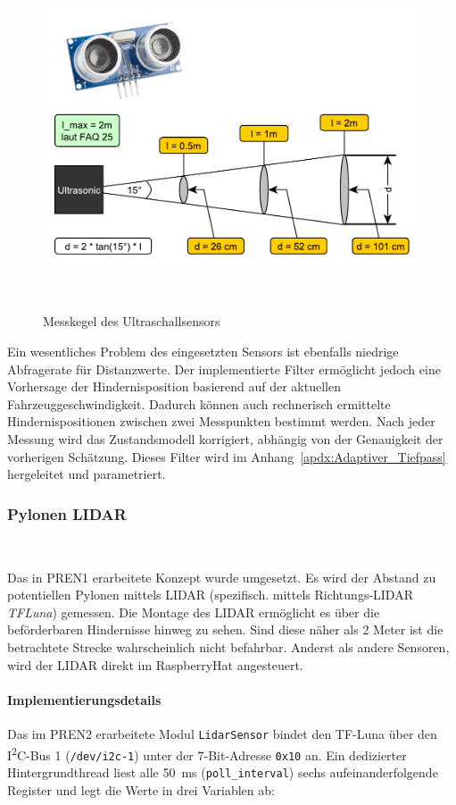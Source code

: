 \documentclass[main.tex]{subfiles} %
\begin{document}
\begin{figure}[H]
  \centering
  \includegraphics[width =
    0.5\linewidth]{./fig_Antriebsregelung_Firmware/Auslesegenauigkeit_Ultraschall.pdf}
  \caption{Messkegel des Ultraschallsensors}~\label{fig:HcSr04_Messkegel}
\end{figure}

Ein wesentliches Problem des eingesetzten Sensors ist ebenfalls niedrige
Abfragerate für Distanzwerte. Der implementierte Filter ermöglicht jedoch eine
Vorhersage der Hindernisposition basierend auf der aktuellen
Fahrzeuggeschwindigkeit. Dadurch können auch rechnerisch ermittelte
Hindernispositionen zwischen zwei Messpunkten bestimmt werden. Nach jeder
Messung wird das Zustandsmodell korrigiert, abhängig von der Genauigkeit der
vorherigen Schätzung. Dieses Filter wird im
Anhang~\ref{apdx:Adaptiver_Tiefpass} hergeleitet und parametriert.


\subsubsection*{Pylonen LIDAR}~\label{sec:Sensorik_Lidar}

Das in PREN1 erarbeitete Konzept wurde umgesetzt. Es wird der
Abstand zu potentiellen Pylonen
mittels LIDAR (spezifisch. mittels Richtungs-LIDAR \textit{TFLuna}) gemessen.
Die Montage des LIDAR ermöglicht es über die beförderbaren
Hindernisse hinweg zu sehen.
Sind diese näher als 2 Meter ist die betrachtete Strecke
wahrscheinlich nicht befahrbar.
Anderst als andere Sensoren, wird der LIDAR direkt im RaspberryHat angesteuert.

\paragraph{Implementierungsdetails}
Das im PREN2 erarbeitete Modul \texttt{LidarSensor} bindet den TF-Luna über den
I\textsuperscript{2}C-Bus
1 (\texttt{/dev/i2c-1}) unter der 7-Bit-Adresse \texttt{0x10} an.
Ein dedizierter Hintergrundthread liest alle \SI{50}{ms}
(\texttt{poll\_interval}) sechs aufeinanderfolgende Register und legt
die Werte in drei Variablen ab:
\end{document}
